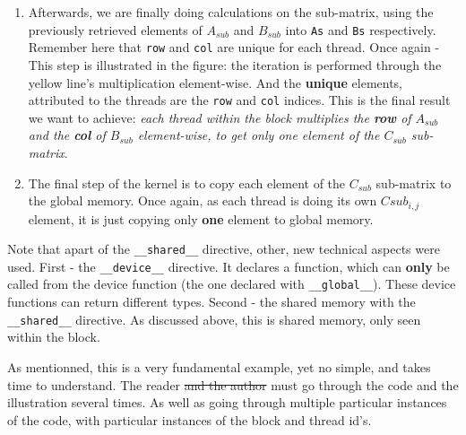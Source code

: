 {\begin{enumerate}
   making the calculations, we want all the 16 data to be loaded into shared memory.
   \item Afterwards, we are finally doing calculations on the sub-matrix, using the previously retrieved elements of $A_{sub}$ and $B_{sub}$ into \verb|As| and \verb|Bs| respectively.
   Remember here that \verb|row| and \verb|col| are unique for each thread. Once again - This step is illustrated in the figure: the iteration is performed through the yellow 
   line's multiplication element-wise. And the \textbf{unique} elements, attributed to the threads are the \verb|row| and \verb|col| indices. This is the final result 
   we want to achieve: \textit{each thread within the block multiplies the \textbf{row} of $A_{sub}$ and the \textbf{col} of $B_{sub}$ element-wise, to get only one element of the $C_{sub}$ sub-matrix}.
   \item The final step of the kernel is to copy each element of the $C_{sub}$ sub-matrix to the global memory. Once again, 
   as each thread is doing its own $Csub_{i,j}$ element, it is just copying only \textbf{one} element to global memory.   
\end{enumerate}
   Note that apart of the \verb|__shared__| directive, other, new technical aspects were used. First - the \verb|__device__| directive.
   It declares a function, which can \textbf{only} be called from the device function (the one declared with \verb|__global__|). These device functions 
   can return different types. Second - the shared memory with the \verb|__shared__| directive. As discussed above, this is shared memory, only seen within the block.
    

   As mentionned, this is a very fundamental example, yet no simple, and takes time to understand. The reader \sout{and the author} must go through the code 
   and the illustration several times. As well as going through multiple particular instances of the code, with particular instances of the block and thread id's.


}
